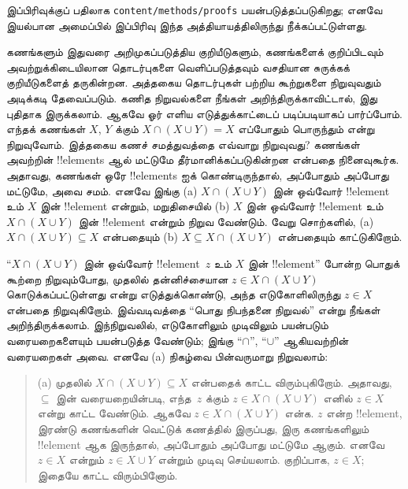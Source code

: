 \documentclass[../../../include/open-logic-section]{subfiles}
\begin{document}

\begin{editorial}
இப்பிரிவுக்குப் பதிலாக \verb|content/methods/proofs| பயன்படுத்தப்படுகிறது;
எனவே இயல்பான அமைப்பில் இப்பிரிவு இந்த அத்தியாயத்திலிருந்து
நீக்கப்பட்டுள்ளது.
\end{editorial}

\begin{explain}
கணங்களும் இதுவரை அறிமுகப்படுத்திய குறியீடுகளும்,
கணங்களைக் குறிப்பிடவும் அவற்றுக்கிடையிலான தொடர்புகளை
வெளிப்படுத்தவும் வசதியான சுருக்கக் குறியீடுகளைத் தருகின்றன.
அத்தகைய தொடர்புகள் பற்றிய கூற்றுகளை நிறுவுவதும் அடிக்கடி
தேவைப்படும். கணித நிறுவல்களை நீங்கள் அறிந்திருக்காவிட்டால்,
இது புதிதாக இருக்கலாம். ஆகவே ஓர் எளிய எடுத்துக்காட்டைப்
படிப்படியாகப் பார்ப்போம். எந்தக் கணங்கள் $X$, $Y$ க்கும்
$X \cap (X \cup Y) = X$ எப்போதும் பொருந்தும் என்று
நிறுவுவோம். இத்தகைய கணச் சமத்துவத்தை எவ்வாறு நிறுவுவது?
கணங்கள் அவற்றின் !!{element}s ஆல் மட்டுமே தீர்மானிக்கப்படுகின்றன
என்பதை நினைவுகூர்க. அதாவது, கணங்கள் ஒரே !!{element}s ஐக்
கொண்டிருந்தால், அப்போதும் அப்போது மட்டுமே, அவை சமம்.
எனவே இங்கு (a) $X \cap (X \cup Y)$ இன் ஒவ்வோர் !!{element}
உம் $X$ இன் !!{element} என்றும், மறுதிசையில்
(b) $X$ இன் ஒவ்வோர் !!{element} உம் $X \cap (X \cup Y)$ இன்
!!{element} என்றும் நிறுவ வேண்டும். வேறு சொற்களில்,
(a) $X \cap (X \cup Y) \subseteq X$ என்பதையும்
(b) $X \subseteq X \cap (X \cup Y)$ என்பதையும் காட்டுகிறோம்.

``$X \cap (X \cup Y)$ இன் ஒவ்வோர் !!{element}~$z$ உம்
$X$ இன் !!{element}'' போன்ற பொதுக் கூற்றை நிறுவும்போது,
முதலில் தன்னிச்சையான $z \in X \cap (X \cup Y)$ கொடுக்கப்பட்டுள்ளது
என்று எடுத்துக்கொண்டு, அந்த எடுகோளிலிருந்து $z \in X$ என்பதை
நிறுவுகிறோம். இவ்வடிவத்தை ``பொது நிபந்தனை நிறுவல்'' என்று
நீங்கள் அறிந்திருக்கலாம். இந்நிறுவலில், எடுகோளிலும் முடிவிலும்
பயன்படும் வரையறைகளையும் பயன்படுத்த வேண்டும்; இங்கு
``$\cap$'', ``$\cup$'' ஆகியவற்றின் வரையறைகள் அவை.
எனவே (a) நிகழ்வை பின்வருமாறு நிறுவலாம்:

\begin{quote}
(a) முதலில் $X \cap (X \cup Y) \subseteq X$ என்பதைக்
காட்ட விரும்புகிறோம். அதாவது, $\subseteq$ இன் வரையறையின்படி,
எந்த~$z$ க்கும் $z \in X \cap (X \cup Y)$ எனில்
$z \in X$ என்று காட்ட வேண்டும். ஆகவே
$z \in X \cap (X \cup Y)$ என்க. $z$ என்ற !!{element},
இரண்டு கணங்களின் வெட்டுக் கணத்தில் இருப்பது, இரு கணங்களிலும்
!!{element} ஆக இருந்தால், அப்போதும் அப்போது மட்டுமே ஆகும்.
எனவே $z \in X$ என்றும் $z \in X \cup Y$ என்றும் முடிவு
செய்யலாம். குறிப்பாக, $z \in X$; இதையே காட்ட விரும்பினோம்.
\end{quote}


\end{explain}
\end{document}
